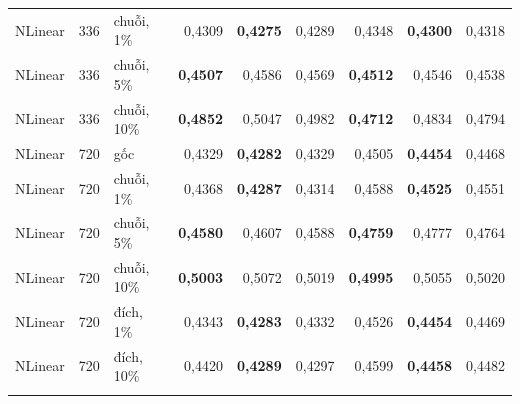{\begin{longtable}{@{}lr l rrr rrr@{}}
NLinear & 336 & chuỗi, 1\% & 0{,}4309 & \textbf{0{,}4275} & 0{,}4289 & 0{,}4348 & \textbf{0{,}4300} & 0{,}4318 \\
NLinear & 336 & chuỗi, 5\% & \textbf{0{,}4507} & 0{,}4586 & 0{,}4569 & \textbf{0{,}4512} & 0{,}4546 & 0{,}4538 \\
NLinear & 336 & chuỗi, 10\% & \textbf{0{,}4852} & 0{,}5047 & 0{,}4982 & \textbf{0{,}4712} & 0{,}4834 & 0{,}4794 \\
\addlinespace[2pt]
NLinear & 720 & gốc & 0{,}4329 & \textbf{0{,}4282} & 0{,}4329 & 0{,}4505 & \textbf{0{,}4454} & 0{,}4468 \\
NLinear & 720 & chuỗi, 1\% & 0{,}4368 & \textbf{0{,}4287} & 0{,}4314 & 0{,}4588 & \textbf{0{,}4525} & 0{,}4551 \\
NLinear & 720 & chuỗi, 5\% & \textbf{0{,}4580} & 0{,}4607 & 0{,}4588 & \textbf{0{,}4759} & 0{,}4777 & 0{,}4764 \\
NLinear & 720 & chuỗi, 10\% & \textbf{0{,}5003} & 0{,}5072 & 0{,}5019 & \textbf{0{,}4995} & 0{,}5055 & 0{,}5020 \\
NLinear & 720 & đích, 1\% & 0{,}4343 & \textbf{0{,}4283} & 0{,}4332 & 0{,}4526 & \textbf{0{,}4454} & 0{,}4469 \\
NLinear & 720 & đích, 10\% & 0{,}4420 & \textbf{0{,}4289} & 0{,}4297 & 0{,}4599 & \textbf{0{,}4458} & 0{,}4482 \\
\addlinespace[2pt]
\bottomrule
\end{longtable}
}
